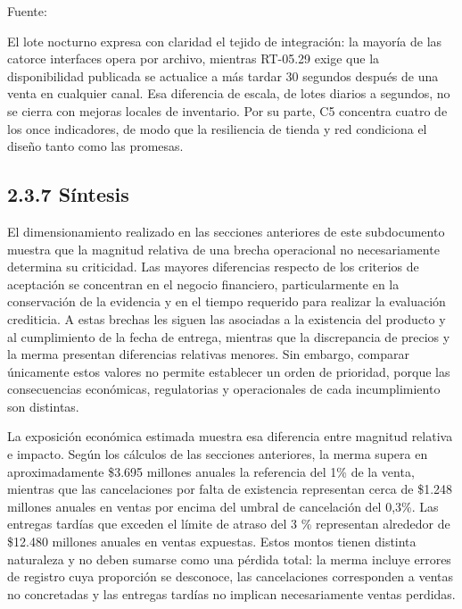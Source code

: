 \documentclass[11pt]{article}
\begin{document}
Fuente:

El lote nocturno expresa con claridad el tejido de integración: la mayoría de las catorce interfaces opera por archivo, mientras RT-05.29 exige que la disponibilidad publicada se actualice a más tardar 30 segundos después de una venta en cualquier canal. Esa diferencia de escala, de lotes diarios a segundos, no se cierra con mejoras locales de inventario. Por su parte, C5 concentra cuatro de los once indicadores, de modo que la resiliencia de tienda y red condiciona el diseño tanto como las promesas.

\subsection{2.3.7 Síntesis}\label{suxedntesis}

El dimensionamiento realizado en las secciones anteriores de este subdocumento muestra que la magnitud relativa de una brecha operacional no necesariamente determina su criticidad. Las mayores diferencias respecto de los criterios de aceptación se concentran en el negocio financiero, particularmente en la conservación de la evidencia y en el tiempo requerido para realizar la evaluación crediticia. A estas brechas les siguen las asociadas a la existencia del producto y al cumplimiento de la fecha de entrega, mientras que la discrepancia de precios y la merma presentan diferencias relativas menores. Sin embargo, comparar únicamente estos valores no permite establecer un orden de prioridad, porque las consecuencias económicas, regulatorias y operacionales de cada incumplimiento son distintas.

La exposición económica estimada muestra esa diferencia entre magnitud relativa e impacto. Según los cálculos de las secciones anteriores, la merma supera en aproximadamente \$3.695 millones anuales la referencia del 1\% de la venta, mientras que las cancelaciones por falta de existencia representan cerca de \$1.248 millones anuales en ventas por encima del umbral de cancelación del 0,3\%. Las entregas tardías que exceden el límite de atraso del 3 \% representan alrededor de \$12.480 millones anuales en ventas expuestas. Estos montos tienen distinta naturaleza y no deben sumarse como una pérdida total: la merma incluye errores de registro cuya proporción se desconoce, las cancelaciones corresponden a ventas no concretadas y las entregas tardías no implican necesariamente ventas perdidas.
\end{document}
